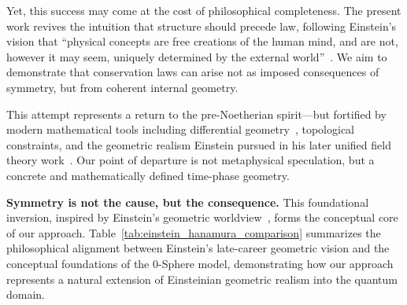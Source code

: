 \documentclass[%
 reprint,
 amsmath,amssymb,
 aps,
]{revtex4-1}
\numberwithin{equation}{section}%
\begin{document}
Yet, this success may come at the cost of philosophical completeness. The present work revives the intuition that structure should precede law, following Einstein's vision that ``physical concepts are free creations of the human mind, and are not, however it may seem, uniquely determined by the external world''~\cite{einstein1936}. We aim to demonstrate that conservation laws can arise not as imposed consequences of symmetry, but from coherent internal geometry.

This attempt represents a return to the pre-Noetherian spirit---but fortified by modern mathematical tools including differential geometry~\cite{abraham1988}, topological constraints, and the geometric realism Einstein pursued in his later unified field theory work~\cite{einstein1955}. Our point of departure is not metaphysical speculation, but a concrete and mathematically defined time-phase geometry.

\textbf{Symmetry is not the cause, but the consequence.} This foundational inversion, inspired by Einstein's geometric worldview~\cite{einstein1915}, forms the conceptual core of our approach. Table~\ref{tab:einstein_hanamura_comparison} summarizes the philosophical alignment between Einstein's late-career geometric vision and the conceptual foundations of the 0-Sphere model, demonstrating how our approach represents a natural extension of Einsteinian geometric realism into the quantum domain.
\end{document}
